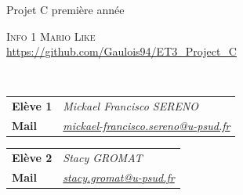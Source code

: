 \begin{titlepage}
\begin{minipage}[t]{0.4\textwidth}
	\begin{flushleft}
	\hspace{0.1cm}Projet C première année\\
	\end{flushleft}
\end{minipage}\hfill
\begin{minipage}[t]{0.4\textwidth}
	\begin{flushright}
	\textsc{Info 1}
	\textsc{Mario Like} \\
	\href{https://github.com/Gaulois94/ET3\_Project\_C/}{https://github.com/Gaulois94/ET3\_Project\_C}
	\end{flushright}
\end{minipage} ~\\[1cm]

\begin{minipage}[t]{0.5\textwidth}
	\begin{flushleft}
		\begin{tabular}{>{\bfseries}l@{:}>{\itshape}l}
		Elève 1 & Mickael Francisco SERENO\\
		Mail & \href{mailto:mickael-francisco.sereno@u-psud.fr}{mickael-francisco.sereno@u-psud.fr}\\
		\end{tabular}
	\end{flushleft}
\end{minipage}\hfill
\begin{minipage}[t]{0.4\textwidth}
	\begin{flushright}
		\begin{tabular}{>{\bfseries}l@{:}>{\itshape}l}
		Elève 2 & Stacy GROMAT\\
		Mail & \href{mailto:stacy.gromat@u-psud.fr}{stacy.gromat@u-psud.fr}\\
		\end{tabular}
	\end{flushright}
\end{minipage}\hfill


\end{titlepage}
